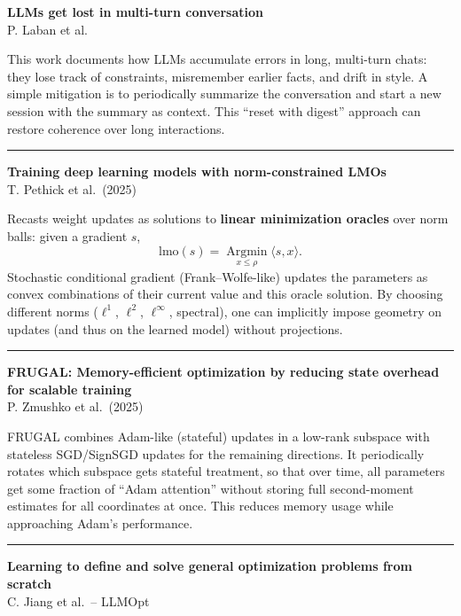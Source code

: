 \documentclass[a5paper]{article}
\let\leq\leqslant
\begin{document}
\textbf{LLMs get lost in multi-turn conversation}\\
P. Laban et al.

This work documents how LLMs accumulate errors in long, multi-turn
chats: they lose track of constraints, misremember earlier facts, and
drift in style. A simple mitigation is to periodically summarize the
conversation and start a new session with the summary as context. This
``reset with digest'' approach can restore coherence over long
interactions.

\begin{center}\rule{0.5\linewidth}{0.5pt}\end{center}

\textbf{Training deep learning models with norm-constrained LMOs}\\
T. Pethick et al.~(2025)

Recasts weight updates as solutions to \textbf{linear minimization
oracles} over norm balls: given a gradient $s$,
\[ \text{lmo}(s) = \operatorname*{Argmin}_{ x\leq\rho} \langle s,
x \rangle. \]
Stochastic conditional gradient (Frank--Wolfe-like) updates the
parameters as convex combinations of their current value and this oracle
solution. By choosing different norms ($\ell^1$, $\ell^2$, $\ell^\infty$, spectral), one can
implicitly impose geometry on updates (and thus on the learned model)
without projections.

\begin{center}\rule{0.5\linewidth}{0.5pt}\end{center}

\textbf{FRUGAL: Memory-efficient optimization by reducing state overhead
for scalable training}\\
P. Zmushko et al.~(2025)

FRUGAL combines Adam-like (stateful) updates in a low-rank subspace with
stateless SGD/SignSGD updates for the remaining directions. It
periodically rotates which subspace gets stateful treatment, so that
over time, all parameters get some fraction of ``Adam attention''
without storing full second-moment estimates for all coordinates at
once. This reduces memory usage while approaching Adam's performance.

\begin{center}\rule{0.5\linewidth}{0.5pt}\end{center}

\textbf{Learning to define and solve general optimization problems from
scratch}\\
C. Jiang et al.~-- LLMOpt
\end{document}
